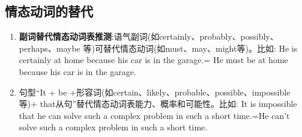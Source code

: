 \subsection{情态动词的替代}

\begin{enumerate}
  \item \textbf{副词替代情态动词表推测}:语气副词(如certainly、probably、possibly、perhaps、maybe 等)可替代情态动词(如must、may、might等)。比如: He is certainly at home because his car is in the garage.= He must be at home because his car is in the garage.
  \item 句型“It + be +形容词(如certain、likely、probable、possible、impossible等)+ that从句”替代情态动词表能力、概率和可能性。比如: It is impossible that he can solve such a complex problem in such a short time.=He can't solve such a complex problem in such a short time.
\end{enumerate}




